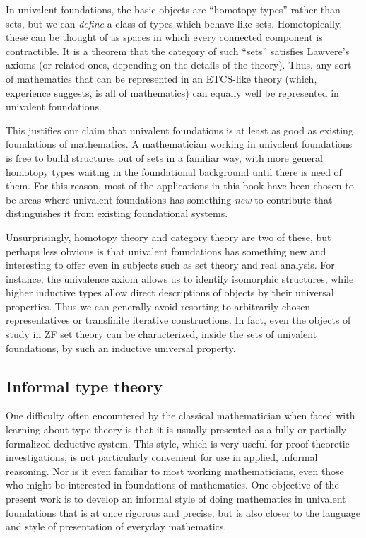 In univalent foundations, the basic objects are ``homotopy types'' rather than sets, but we can \emph{define} a class of types which behave like sets.
Homotopically, these can be thought of as spaces in which every connected component is contractible.
It is a theorem that the category of such ``sets'' satisfies Lawvere's axioms (or related ones, depending on the details of the theory).
Thus, any sort of mathematics that can be represented in an ETCS-like theory (which, experience suggests, is all of mathematics) can equally well be represented in univalent foundations.

This justifies our claim that univalent foundations is at least as good as existing foundations of mathematics.
A mathematician working in univalent foundations is free to build structures out of sets in a familiar way, with more general homotopy types waiting in the foundational background until there is need of them.
For this reason, most of the applications in this book have been chosen to be areas where univalent foundations has something \emph{new} to contribute that distinguishes it from existing foundational systems.

Unsurprisingly, homotopy theory and category theory are two of these, but perhaps less obvious is that univalent foundations has something new and interesting to offer even in subjects such as set theory and real analysis.
For instance, the univalence axiom allows us to identify isomorphic structures, while higher inductive types allow direct descriptions of objects by their universal properties.
Thus we can generally avoid resorting to arbitrarily chosen representatives or transfinite iterative constructions.
In fact, even the objects of study in ZF set theory can be characterized, inside the sets of univalent foundations, by such an inductive universal property.


\subsection*{Informal type theory}

One difficulty often encountered by the classical mathematician when faced with learning about type theory is that it is usually presented as a fully or partially formalized deductive system.
This style, which is very useful for proof-theoretic investigations, is not particularly convenient for use in applied, informal reasoning.
Nor is it even familiar to most working mathematicians, even those who might be interested in foundations of mathematics.
One objective of the present work is to develop an informal style of doing mathematics in univalent foundations that is at once rigorous and precise, but is also closer to the language and style of presentation of everyday mathematics.

